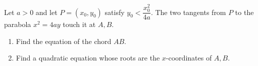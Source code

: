 Let $a>0$ and let $P=(x_0,y_0)$ satisfy $y_0<\dfrac{x_0^2}{4a}$. The two tangents from $P$ to the parabola $x^2=4ay$ touch it at $A,B$.
\begin{enumerate}\item Find the equation of the chord $AB$.\item Find a quadratic equation whose roots are the $x$-coordinates of $A,B$.\end{enumerate}
